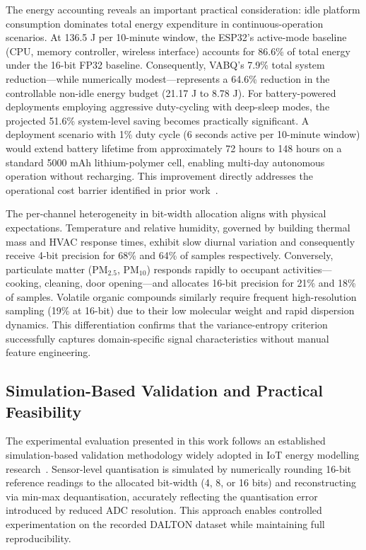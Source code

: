 The energy accounting reveals an important practical consideration: idle platform consumption dominates total energy expenditure in continuous-operation scenarios. At 136.5 J per 10-minute window, the ESP32's active-mode baseline (CPU, memory controller, wireless interface) accounts for 86.6\% of total energy under the 16-bit FP32 baseline. Consequently, VABQ's 7.9\% total system reduction---while numerically modest---represents a 64.6\% reduction in the controllable non-idle energy budget (21.17 J to 8.78 J). For battery-powered deployments employing aggressive duty-cycling with deep-sleep modes, the projected 51.6\% system-level saving becomes practically significant. A deployment scenario with 1\% duty cycle (6 seconds active per 10-minute window) would extend battery lifetime from approximately 72 hours to 148 hours on a standard 5000 mAh lithium-polymer cell, enabling multi-day autonomous operation without recharging. This improvement directly addresses the operational cost barrier identified in prior work~\cite{energysustainable2023,reducingpower2024}.

The per-channel heterogeneity in bit-width allocation aligns with physical expectations. Temperature and relative humidity, governed by building thermal mass and HVAC response times, exhibit slow diurnal variation and consequently receive 4-bit precision for 68\% and 64\% of samples respectively. Conversely, particulate matter (PM$_{2.5}$, PM$_{10}$) responds rapidly to occupant activities---cooking, cleaning, door opening---and allocates 16-bit precision for 21\% and 18\% of samples. Volatile organic compounds similarly require frequent high-resolution sampling (19\% at 16-bit) due to their low molecular weight and rapid dispersion dynamics. This differentiation confirms that the variance-entropy criterion successfully captures domain-specific signal characteristics without manual feature engineering.

\subsection{Simulation-Based Validation and Practical Feasibility}
\label{sec:disc_validation}

The experimental evaluation presented in this work follows an established simulation-based validation methodology widely adopted in IoT energy modelling research~\cite{espressif2024,kluedo2024simulation}. Sensor-level quantisation is simulated by numerically rounding 16-bit reference readings to the allocated bit-width (4, 8, or 16 bits) and reconstructing via min-max dequantisation, accurately reflecting the quantisation error introduced by reduced ADC resolution. This approach enables controlled experimentation on the recorded DALTON dataset while maintaining full reproducibility.

